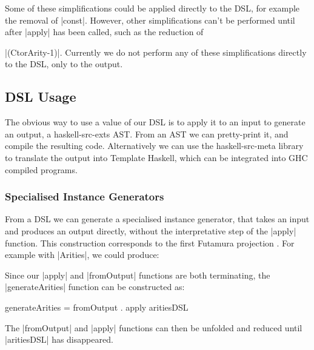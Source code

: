 \documentclass{llncs}
\begin{document}
Some of these simplifications could be applied directly to the DSL, for example the removal of |const|. However, other simplifications can't be performed until after |apply| has been called, such as the reduction of \ignore|(CtorArity-1)|. Currently we do not perform any of these simplifications directly to the DSL, only to the output.

\subsection{DSL Usage}

The obvious way to use a value of our DSL is to apply it to an input to generate an output, a haskell-src-exts AST. From an AST we can pretty-print it, and compile the resulting code. Alternatively we can use the haskell-src-meta library \cite{haskell_src_meta} to translate the output into Template Haskell, which can be integrated into GHC compiled programs.

\subsubsection{Specialised Instance Generators}

From a DSL we can generate a specialised instance generator, that takes an input and produces an output directly, without the interpretative step of the |apply| function. This construction corresponds to the first Futamura projection \cite{futanama:projections}. For example with |Arities|, we could produce:


Since our |apply| and |fromOutput| functions are both terminating, the |generateArities| function can be constructed as:

\begin{code}
generateArities = fromOutput . apply aritiesDSL
\end{code}

The |fromOutput| and |apply| functions can then be unfolded and reduced until |aritiesDSL| has disappeared.
\end{document}
